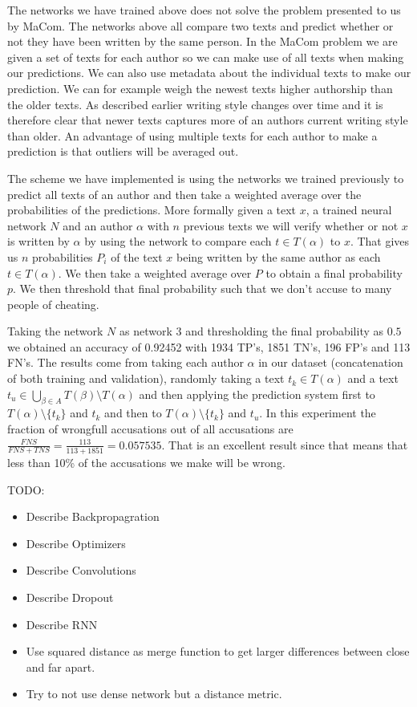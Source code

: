 The networks we have trained above does not solve the problem presented to us
by MaCom. The networks above all compare two texts and predict whether or not
they have been written by the same person. In the MaCom problem we are given a
set of texts for each author so we can make use of all texts when making our
predictions. We can also use metadata about the individual texts to make our
prediction. We can for example weigh the newest texts higher authorship than
the older texts. As described earlier writing style changes over time and it is
therefore clear that newer texts captures more of an authors current writing
style than older. An advantage of using multiple texts for each author to make a
prediction is that outliers will be averaged out.

The scheme we have implemented is using the networks we trained previously
to predict all texts of an author and then take a weighted average over the
probabilities of the predictions. More formally given a text $x$, a trained
neural network $N$ and an author $\alpha$ with $n$ previous texts we will verify
whether or not $x$ is written by $\alpha$ by using the network to compare each
$t \in T(\alpha)$ to $x$. That gives us $n$ probabilities $P_i$ of the text
$x$ being written by the same author as each $t \in T(\alpha)$. We then take a
weighted average over $P$ to obtain a final probability $p$. We then threshold
that final probability such that we don't accuse to many people of cheating.

Taking the network $N$ as network 3 and thresholding the final probability as
$0.5$ we obtained an accuracy of 0.92452 with 1934 \gls{TP}'s, 1851 \gls{TN}'s,
196 \gls{FP}'s and 113 \gls{FN}'s. The results come from taking each author
$\alpha$ in our dataset (concatenation of both training and validation),
randomly taking a text $t_k \in T(\alpha)$ and a text
$t_u \in \bigcup_{\beta \in A} T(\beta) \setminus T(\alpha)$ and then applying
the prediction system first to $T(\alpha) \setminus \{t_k\}$ and $t_k$ and then
to $T(\alpha) \setminus \{t_k\}$ and $t_u$. In this experiment the fraction of
wrongfull accusations out of all accusations are $\frac{FNS}{FNS + TNS} =
\frac{113}{113 + 1851} = 0.057535$. That is an excellent result since that means
that less than 10\% of the accusations we make will be wrong.

TODO:
\begin{itemize}
    \item Describe Backpropagration
    \item Describe Optimizers
    \item Describe Convolutions
    \item Describe Dropout
    \item Describe RNN
    \item Use squared distance as merge function to get larger differences
        between close and far apart.
    \item Try to not use dense network but a distance metric.
\end{itemize}
